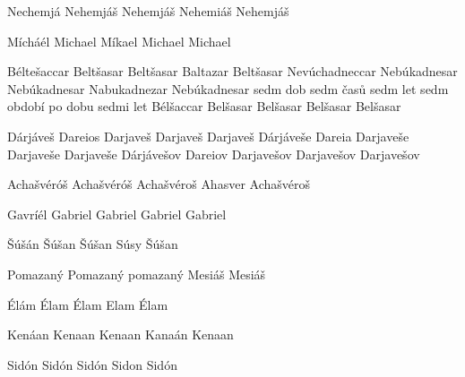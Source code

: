        {Nechemjá} %
       {Nehemjáš} %
       {Nehemjáš} %
       {Nehemiáš} %
       {Nehemjáš} %

       {Mícháél} %
       {Michael} %
       {Míkael} %
       {Michael} %
       {Michael} %





       {Béltešaccar}  {Beltšasar}    {Beltšasar}    {Baltazar} {Beltšasar}
 {Nevúchadneccar}  {Nebúkadnesar} {Nebúkadnesar} {Nabukadnezar} {Nebúkadnesar}
 {sedm dob} {sedm časů} {sedm let} {sedm období} {po dobu sedmi let}
  {Bélšaccar} {Belšasar}   {Belšasar}  {Belšasar}  {Belšasar}

  {Dárjáveš}   {Dareios} {Darjaveš}   {Darjaveš}   {Darjaveš}
   {Dárjáveše}  {Dareia}  {Darjaveše}  {Darjaveše}  {Darjaveše}
  {Dárjávešov} {Dareiov} {Darjavešov} {Darjavešov} {Darjavešov}

 {Achašvéróš} {Achašvéróš} {Achašvéroš} {Ahasver} {Achašvéroš}

 {Gavríél} {Gabriel} {Gabriel} {Gabriel} {Gabriel}


 {Šúšán} {Šúšan} {Šúšan} {Súsy} {Šúšan} %

 {Pomazaný} {Pomazaný} {pomazaný} {Mesiáš} {Mesiáš}

  {Élám} {Élam}  {Élam} {Elam} {Élam} 


        {Kenáan}  %
        {Kenaan}  %
        {Kenaan}  %
        {Kanaán}  %
        {Kenaan}  %

 {Sidón} {Sidón} {Sidón} {Sidon} {Sidón}

\endinput

